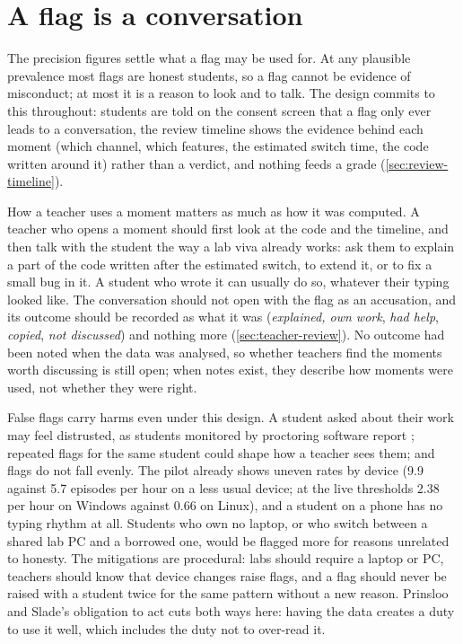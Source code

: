 \section{A flag is a conversation}
\label{sec:disc-conversation}
The precision figures settle what a flag may be used for. At any plausible
prevalence most flags are honest students, so a flag cannot be evidence of
misconduct; at most it is a reason to look and to talk. The design commits to
this throughout: students are told on the consent screen that a flag only ever
leads to a conversation, the review timeline shows the evidence behind each
moment (which channel, which features, the estimated switch time, the code
written around it) rather than a verdict, and nothing feeds a grade
(\cref{sec:review-timeline}).

How a teacher uses a moment matters as much as how it was computed. A teacher
who opens a moment should first look at the code and the timeline, and then talk
with the student the way a lab viva already works: ask them to explain a part of
the code written after the estimated switch, to extend it, or to fix a small bug
in it. A student who wrote it can usually do so, whatever their typing looked
like. The conversation should not open with the flag as an accusation, and its
outcome should be recorded as what it was (\emph{explained, own work},
\emph{had help}, \emph{copied}, \emph{not discussed}) and nothing more
(\cref{sec:teacher-review}). No outcome had been
noted when the data was analysed, so whether teachers find the moments worth
discussing is still open; when notes exist, they describe how moments were
used, not whether they were right.

False flags carry harms even under this design. A student asked about their work
may feel distrusted, as students monitored by proctoring software report
\cite{balash2021examining,coghlan2021proctor}; repeated flags for the same
student could shape how a teacher sees them; and flags do not fall evenly. The
pilot already shows uneven rates by device (9.9 against 5.7 episodes per hour
on a less usual device; at the live thresholds 2.38 per hour on Windows against
0.66 on Linux), and a student on a phone has no typing rhythm at all.
Students who own no laptop, or who switch between a shared lab PC and a borrowed
one, would be flagged more for reasons unrelated to honesty. The mitigations are
procedural: labs should require a laptop or PC, teachers should know that device
changes raise flags, and a flag should never be raised with a student twice for
the same pattern without a new reason. Prinsloo and Slade's obligation to act
\cite{prinsloo2017elephant} cuts both ways here: having the data creates a duty
to use it well, which includes the duty not to over-read it.

